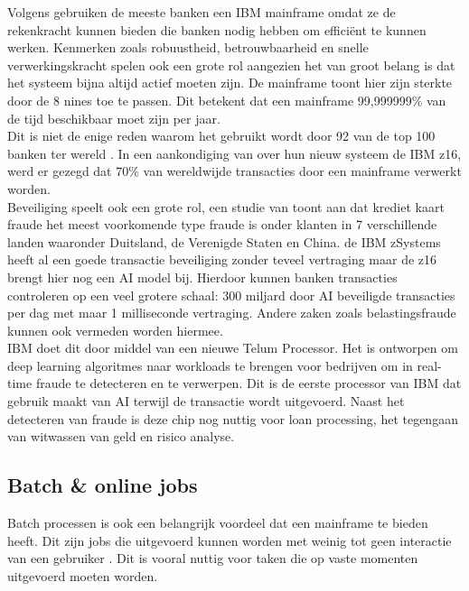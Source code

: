 Volgens \textcite{Turner2022} gebruiken de meeste banken een IBM mainframe omdat ze de rekenkracht kunnen bieden die banken nodig hebben om efficiënt te kunnen werken. Kenmerken zoals robuustheid, betrouwbaarheid en snelle verwerkingskracht spelen ook een grote rol aangezien het van groot belang is dat het systeem bijna altijd actief moeten zijn. De mainframe toont hier zijn sterkte door de 8 nines toe te passen. Dit betekent dat een mainframe 99,999999\% van de tijd beschikbaar moet zijn per jaar. \autocite{IBMa} \\

Dit is niet de enige reden waarom het gebruikt wordt door 92 van de top 100 banken ter wereld \autocite{Tozzi2022}. In een aankondiging van \textcite{IBM2022} over hun nieuw systeem de IBM z16, werd er gezegd dat 70\% van wereldwijde transacties door een mainframe verwerkt worden. \\

Beveiliging speelt ook een grote rol, een studie van \textcite{MorningConsult2022} toont aan dat krediet kaart fraude het meest voorkomende type fraude is onder klanten in 7 verschillende landen waaronder Duitsland, de Verenigde Staten en China. de IBM zSystems heeft al een goede transactie beveiliging zonder teveel vertraging maar de z16 brengt hier nog een AI model bij. Hierdoor kunnen banken transacties controleren op een veel grotere schaal: 300 miljard door AI beveiligde transacties per dag met maar 1 milliseconde vertraging. Andere zaken zoals belastingsfraude kunnen ook vermeden worden hiermee. \autocite{IBM2022} \\

IBM doet dit door middel van een nieuwe Telum Processor. Het is ontworpen om deep learning algoritmes naar workloads te brengen voor bedrijven om in real-time fraude te detecteren en te verwerpen. Dit is de eerste processor van IBM dat gebruik maakt van AI terwijl de transactie wordt uitgevoerd. Naast het detecteren van fraude is deze chip nog nuttig voor loan processing, het tegengaan van witwassen van geld en risico analyse. \autocite{IBM2021a} \\

\subsection{Batch \& online jobs}
Batch processen is ook een belangrijk voordeel dat een mainframe te bieden heeft. Dit zijn jobs die uitgevoerd kunnen worden met weinig tot geen interactie van een gebruiker \autocite{IBM}. Dit is vooral nuttig voor taken die op vaste momenten uitgevoerd moeten worden.

